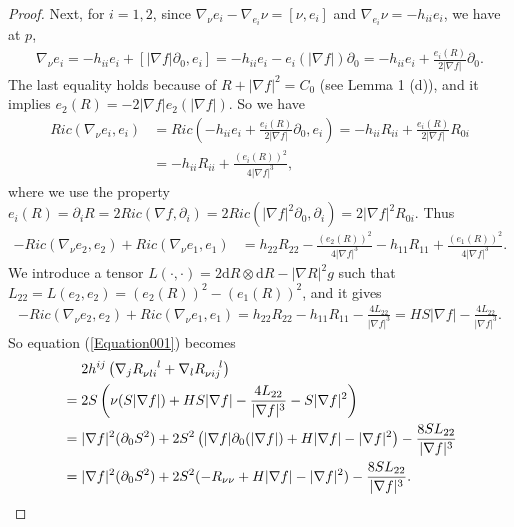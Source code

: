 \documentclass[12pt,a4paper]{amsart}
\begin{document}
\begin{proof}
Next, for $i=1,2$, since $\nabla_{\nu}e_i-\nabla_{e_i}\nu=[\nu,e_i]$ and $\nabla_{e_i}\nu=-h_{ii}e_i$, we have at $p$,
\begin{align*}
\nabla_{\nu}e_i
=-h_{ii}e_i+[|\nabla f|\partial_0,e_i]
=-h_{ii}e_i-e_i(|\nabla f|)\partial_0
=-h_{ii}e_i+\frac{e_i(R)}{2|\nabla f|}\partial_0.
\end{align*}
The last equality holds because of $R+|\nabla f|^2=C_0$ (see Lemma 1 (d)), and it implies $e_2(R)=-2|\nabla f|e_2(|\nabla f|)$.
So we have
\begin{align*}
Ric(\nabla_{\nu}e_i,e_i)
&=Ric\left(-h_{ii}e_i+\frac{e_i(R)}{2|\nabla f|}\partial_0,e_i\right)
=-h_{ii}R_{ii}+\frac{e_i(R)}{2|\nabla f|}R_{0i} \\
&=-h_{ii}R_{ii}+\frac{(e_i(R))^2}{4|\nabla f|^3},
\end{align*}
where we use the property $e_i(R)=\partial_iR=2Ric(\nabla f,\partial_i)=2Ric(|\nabla f|^2\partial_0,\partial_i)=2|\nabla f|^2R_{0i}$.
Thus
\begin{align*}
-Ric(\nabla_{\nu}e_2,e_2)+Ric(\nabla_{\nu}e_1,e_1)
&=h_{22}R_{22}-\frac{(e_2(R))^2}{4|\nabla f|^3}
-h_{11}R_{11}+\frac{(e_1(R))^2}{4|\nabla f|^3}.
\end{align*}
We introduce a tensor $L(\cdot,\cdot)=2\mathrm{d}R\otimes\mathrm{d}R-|\nabla R|^2g$
such that $L_{22}=L(e_2,e_2)=(e_2(R))^2-(e_1(R))^2$, and it gives
\begin{align*}
-Ric(\nabla_{\nu}e_2,e_2)+Ric(\nabla_{\nu}e_1,e_1)
=h_{22}R_{22}-h_{11}R_{11}-\frac{4L_{22}}{|\nabla f|^{3}}
=HS|\nabla f|-\frac{4L_{22}}{|\nabla f|^{3}}.
\end{align*}
So equation (\ref{Equation001}) becomes
\begin{align}
&\quad\ 2h^{ij}\left(\nabla_j R_{\nu li}^{\ \ \ l}+\nabla_l R_{\nu ij}^{\ \ \ l}\right) \notag \\
&=2S\left(\nu(S|\nabla f|)+HS|\nabla f|-\frac{4L_{22}}{|\nabla f|^{3}}-S|\nabla f|^2\right) \notag \\
&=|\nabla f|^2(\partial_0S^2)+2S^2\left(|\nabla f|\partial_0(|\nabla f|)+H|\nabla f|-|\nabla f|^2\right)-\frac{8SL_{22}}{|\nabla f|^{3}} \notag \\
&=|\nabla f|^2(\partial_0S^2)+2S^2(-R_{\nu\nu}+H|\nabla f|-|\nabla f|^2)-\frac{8SL_{22}}{|\nabla f|^{3}}. \label{equation002}
\end{align}


\end{proof}
\end{document}

